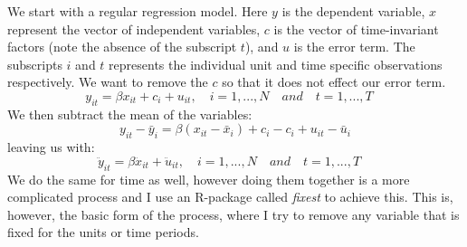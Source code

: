 We start with a regular regression model. Here $y$ is the dependent variable, $x$ represent the vector of independent variables, $c$ is the vector of time-invariant factors (note the absence of the subscript $t$), and $u$ is the error term. The subscripts $i$ and $t$ represents the individual unit and time specific observations respectively. We want to remove the $c$ so that it does not effect our error term. 
\begin{equation}
    y_{it} = \beta x_{it} + c_i + u_{it}, \quad i = 1,..., N \quad and \quad  t = 1,..., T  \quad
\label{equ:within_1}
\end{equation} 
We then subtract the mean of the variables:
\begin{equation}
    y_{it} - \bar{y}_i = \beta (x_{it} - \bar{x}_i) + c_i - c_i + u_{it} - \bar{u}_i
\label{equ:within_2}
\end{equation}
leaving us with:
\begin{equation}
    \ddot{y}_{it} = \beta \ddot{x}_{it} + \ddot{u}_{it}, \quad i = 1,..., N \quad and \quad  t = 1,..., T  \quad 
\label{equ:within_3}
\end{equation}
We do the same for time as well, however doing them together is a more complicated process and I use an R-package called \textit{fixest} \citep{berge_efficient_2018} to achieve this. This is, however, the basic form of the process, where I try to remove any variable that is fixed for the units or time periods.

